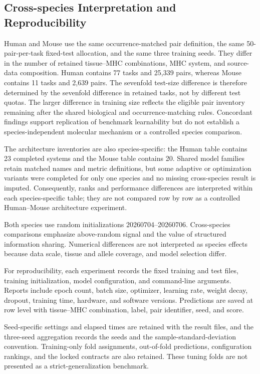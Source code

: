 \subsection{Cross-species Interpretation and Reproducibility}

Human and Mouse use the same occurrence-matched pair definition, the same 50-pair-per-task fixed-test allocation, and the same three training seeds. They differ in the number of retained tissue--MHC combinations, MHC system, and source-data composition. Human contains 77 tasks and 25,339 pairs, whereas Mouse contains 11 tasks and 2,639 pairs. The sevenfold test-size difference is therefore determined by the sevenfold difference in retained tasks, not by different test quotas. The larger difference in training size reflects the eligible pair inventory remaining after the shared biological and occurrence-matching rules. Concordant findings support replication of benchmark learnability but do not establish a species-independent molecular mechanism or a controlled species comparison.

The architecture inventories are also species-specific: the Human table contains 23 completed systems and the Mouse table contains 20. Shared model families retain matched names and metric definitions, but some adaptive or optimization variants were completed for only one species and no missing cross-species result is imputed. Consequently, ranks and performance differences are interpreted within each species-specific table; they are not compared row by row as a controlled Human--Mouse architecture experiment.

Both species use random initializations 20260704--20260706. Cross-species comparisons emphasize above-random signal and the value of structured information sharing. Numerical differences are not interpreted as species effects because data scale, tissue and allele coverage, and model selection differ.

For reproducibility, each experiment records the fixed training and test files, training initialization, model configuration, and command-line arguments. Reports include epoch count, batch size, optimizer, learning rate, weight decay, dropout, training time, hardware, and software versions. Predictions are saved at row level with tissue--MHC combination, label, pair identifier, seed, and score.

Seed-specific settings and elapsed times are retained with the result files, and the three-seed aggregation records the seeds and the sample-standard-deviation convention. Training-only fold assignments, out-of-fold predictions, configuration rankings, and the locked contracts are also retained. These tuning folds are not presented as a strict-generalization benchmark.


